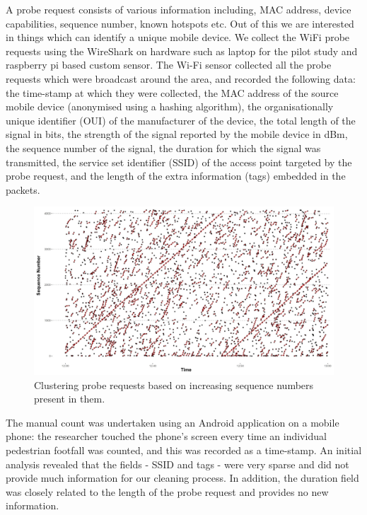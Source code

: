 \documentclass[11t, a4paper, twocolumn]{article}
\begin{document}
		
		A probe request consists of various information including, MAC address, device capabilities, sequence number, known hotspots etc. Out of this we are interested in things which can identify a unique mobile device. We collect the WiFi probe requests using the WireShark on hardware such as laptop for the pilot study and raspberry pi based custom sensor. The Wi-Fi sensor collected all the probe requests which were broadcast around the area, and recorded the following data: the time-stamp at which they were collected, the MAC address of the source mobile device (anonymised using a hashing algorithm), the organisationally unique identifier (OUI) of the manufacturer of the device, the total length of the signal in bits, the strength of the signal reported by the mobile device in dBm, the sequence number of the signal, the duration for which the signal was transmitted, the service set identifier (SSID) of the access point targeted by the probe request, and the length of the extra information (tags) embedded in the packets.
		\begin{figure}
			\begin{center}
				\includegraphics [width=\linewidth,trim=4 4 4 4,clip] {images/methodology_clustering.png}
				\caption{Clustering probe requests based on increasing sequence numbers present in them.}
				\label{clustering_pilot}
			\end{center}
		\end{figure}
		The manual count was undertaken using an Android application on a mobile phone: the researcher touched the phone’s screen every time an individual pedestrian footfall was counted, and this was recorded as a time-stamp.
		An initial analysis revealed that the fields - SSID and tags - were very sparse and did not provide much information for our cleaning process.
		In addition, the duration field was closely related to the length of the probe request and provides no new information.
\end{document}
